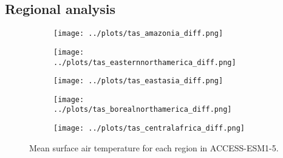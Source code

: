 \documentclass[]{article}
\begin{document}
\subsection{Regional analysis}

\begin{figure}[H]
    \centering
    \begin{subfigure}[b]{0.4\linewidth}
        \texttt{[image: ../plots/tas\_amazonia\_diff.png]}
    \end{subfigure}
    \begin{subfigure}[b]{0.4\linewidth}
        \texttt{[image: ../plots/tas\_easternnorthamerica\_diff.png]}
    \end{subfigure}
    \begin{subfigure}[b]{0.4\linewidth}
        \texttt{[image: ../plots/tas\_eastasia\_diff.png]}
    \end{subfigure}
    \begin{subfigure}[b]{0.4\linewidth}
        \texttt{[image: ../plots/tas\_borealnorthamerica\_diff.png]}
    \end{subfigure}
    \begin{subfigure}[b]{0.4\linewidth}
        \texttt{[image: ../plots/tas\_centralafrica\_diff.png]}
    \end{subfigure}
    \caption{Mean surface air temperature for each region in ACCESS-ESM1-5.}
    \label{fig:ACCESS_tas_regions}
\end{figure}
\end{document}
